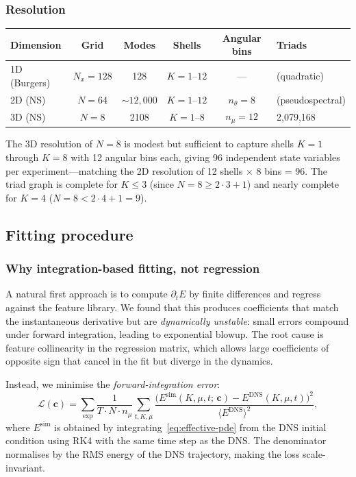 \documentclass[11pt,a4paper]{article}
\theoremstyle{remark}
\begin{document}
\subsubsection{Resolution}

\begin{center}
\begin{tabular}{lccccl}
\toprule
Dimension & Grid & Modes & Shells & Angular bins & Triads \\
\midrule
1D (Burgers) & $N_x = 128$ & 128 & $K = 1\text{--}12$ & --- & (quadratic) \\
2D (NS)      & $N = 64$    & $\sim 12{,}000$ & $K = 1\text{--}12$ & $n_\theta = 8$ & (pseudospectral) \\
3D (NS)      & $N = 8$     & 2108 & $K = 1\text{--}8$  & $n_\mu = 12$ & 2{,}079{,}168 \\
\bottomrule
\end{tabular}
\end{center}

The 3D resolution of $N = 8$ is modest but sufficient to capture shells $K = 1$ through $K = 8$ with 12 angular bins each, giving 96 independent state variables per experiment---matching the 2D resolution of 12 shells $\times$ 8 bins = 96.  The triad graph is complete for $K \leq 3$ (since $N = 8 \geq 2 \cdot 3 + 1$) and nearly complete for $K = 4$ ($N = 8 < 2 \cdot 4 + 1 = 9$).

\subsection{Fitting procedure}\label{sec:fitting}

\subsubsection{Why integration-based fitting, not regression}

A natural first approach is to compute $\partial_t E$ by finite differences and regress against the feature library.  We found that this produces coefficients that match the instantaneous derivative but are \emph{dynamically unstable}: small errors compound under forward integration, leading to exponential blowup.  The root cause is feature collinearity in the regression matrix, which allows large coefficients of opposite sign that cancel in the fit but diverge in the dynamics.

Instead, we minimise the \emph{forward-integration error}:
\[
  \mathcal{L}(\mathbf{c}) = \sum_{\text{exp}} \frac{1}{T \cdot N \cdot n_\mu} \sum_{t,K,\mu} \frac{\bigl( E^{\mathrm{sim}}(K,\mu,t;\,\mathbf{c}) - E^{\mathrm{DNS}}(K,\mu,t) \bigr)^2}{\langle E^{\mathrm{DNS}} \rangle^2},
\]
where $E^{\mathrm{sim}}$ is obtained by integrating~\eqref{eq:effective-pde} from the DNS initial condition using RK4 with the same time step as the DNS.  The denominator normalises by the RMS energy of the DNS trajectory, making the loss scale-invariant.
\end{document}
